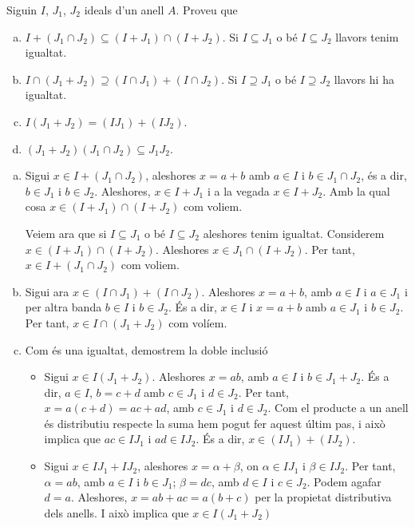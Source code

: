 \documentclass[../main.tex]{subfiles}
\begin{document}
\setcounter{exercici}{8}
\begin{exercici}\label{esal9}
Siguin $I$, $J_1$, $J_2$ ideals d'un anell $A$. Proveu que
\begin{enumerate}[(a)]
    \item $I+(J_1\cap J_2) \subseteq (I+J_1)\cap(I+J_2)$. Si $I\subseteq J_1$ o bé $I\subseteq J_2$ llavors tenim igualtat.
    \item $I\cap(J_1+J_2)\supseteq (I\cap J_1)+(I\cap J_2)$. Si $I \supseteq J_1$ o bé $I\supseteq J_2$ llavors hi ha igualtat.
    \item $I(J_1+J_2)=(IJ_1)+(IJ_2)$.
    \item $(J_1+J_2)(J_1\cap J_2) \subseteq J_1J_2$.
\end{enumerate}
\end{exercici}
\begin{sol}
\begin{enumerate}[(a)]
    \item Sigui $x\in I+(J_1\cap J_2)$, aleshores $x=a+b$ amb $a\in I$ i $b\in J_1\cap J_2$, és a dir, $b\in J_1$ i $b\in J_2$. Aleshores, $x \in I+J_1$ i a la vegada $x\in I+J_2$. Amb la qual cosa $x\in (I+J_1)\cap(I+J_2)$ com voliem.
    
    Veiem ara que si $I\subseteq J_1$ o bé $I\subseteq J_2$ aleshores tenim igualtat. Considerem $x \in (I+J_1)\cap(I+J_2)$. Aleshores $x\in J_1 \cap (I+J_2)$. Per tant, $x\in I+(J_1\cap J_2)$ com voliem. 
    
    \item Sigui ara $x\in (I\cap J_1)+(I\cap J_2)$. Aleshores $x=a+b$, amb $a\in I$ i $a\in J_1$ i per altra banda $b\in I$ i $b\in J_2$. És a dir, $x\in I$ i $x=a+b$ amb $a\in J_1$ i $b\in J_2$. Per tant, $x\in I\cap (J_1+J_2)$ com volíem.
    
    \item Com és una igualtat, demostrem la doble inclusió
    \begin{itemize}
        \item \fbox{$\subseteq$} Sigui $x\in I(J_1+J_2)$. Aleshores $x=ab$, amb $a\in I$ i $b\in J_1+J_2$. És a dir, $a\in I$, $b=c+d$ amb $c\in J_1$ i $d\in J_2$. Per tant, $x=a(c+d)=ac+ad$, amb $c\in J_1$ i $d\in J_2$. Com el producte a un anell és distributiu respecte la suma hem pogut fer aquest últim pas, i això implica que $ac\in IJ_1$ i $ad \in IJ_2$. És a dir, $x\in (IJ_1)+(IJ_2)$.
        \item \fbox{$\supseteq$} Sigui $x\in IJ_1+IJ_2$, aleshores $x=\alpha + \beta$, on $\alpha \in IJ_1$ i $\beta \in IJ_2$. Per tant, $\alpha =ab$, amb $a\in I$ i $b\in J_1$; $\beta =dc$, amb $d\in I$ i $c \in J_2$. Podem agafar $d=a$. Aleshores, $x=ab+ac=a(b+c)$ per la propietat distributiva dels anells. I això implica que $x\in I(J_1+J_2)$
    \end{itemize}
    

\end{enumerate}
\end{sol}
\end{document}

